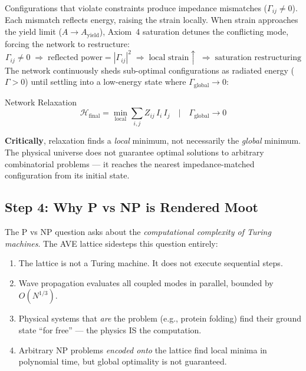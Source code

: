 Configurations that violate constraints produce impedance mismatches ($\Gamma_{ij} \neq 0$). Each mismatch reflects energy, raising the strain locally. When strain approaches the yield limit ($A \to A_\mathrm{yield}$), Axiom~4 saturation detunes the conflicting mode, forcing the network to restructure:
\begin{equation}
    \Gamma_{ij} \neq 0 \;\Longrightarrow\; \text{reflected power} = |\Gamma_{ij}|^2 \;\Longrightarrow\; \text{local strain} \uparrow \;\Longrightarrow\; \text{saturation restructuring}
\end{equation}
The network continuously sheds sub-optimal configurations as radiated energy ($\Gamma > 0$) until settling into a low-energy state where $\Gamma_\mathrm{global} \to 0$:
\begin{resultbox}{Network Relaxation}
\begin{equation}
    \mathcal{H}_\mathrm{final} = \min_\mathrm{local} \sum_{i,j} Z_{ij}\, I_i\, I_j \quad\Big|\quad \Gamma_\mathrm{global} \to 0
\end{equation}
\end{resultbox}

\textbf{Critically}, relaxation finds a \textit{local} minimum, not necessarily the \textit{global} minimum. The physical universe does not guarantee optimal solutions to arbitrary combinatorial problems --- it reaches the nearest impedance-matched configuration from its initial state.

\subsection{Step 4: Why P vs NP is Rendered Moot}

The P vs NP question asks about the \textit{computational complexity of Turing machines}. The AVE lattice sidesteps this question entirely:

\begin{enumerate}
    \item The lattice is not a Turing machine. It does not execute sequential steps.
    \item Wave propagation evaluates all coupled modes in parallel, bounded by $O(N^{1/3})$.
    \item Physical systems that \textit{are} the problem (e.g., protein folding) find their ground state ``for free'' --- the physics IS the computation.
    \item Arbitrary NP problems \textit{encoded onto} the lattice find local minima in polynomial time, but global optimality is not guaranteed.
\end{enumerate}

